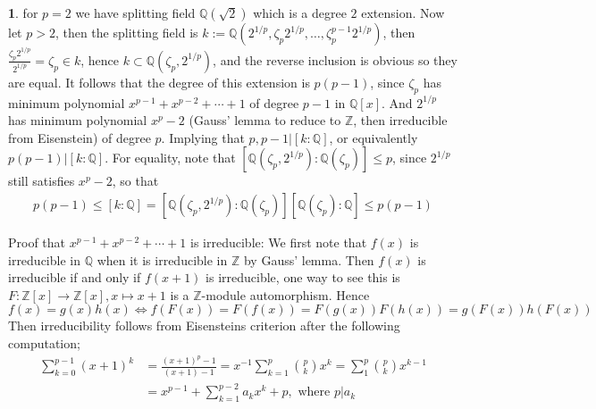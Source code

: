 \documentclass[11pt]{article}
\theoremstyle{definition}
\newtheorem{pb}{}
\begin{document}
    \begin{pb}
        for \(p=2\) we have splitting field \(\mathbb{Q}(\sqrt2)\) which is a degree \(2\) extension. Now let \(p > 2\), then the splitting field is
        \(k := \mathbb{Q}(2^{1/p},\zeta_p2^{1/p},\hdots,\zeta_p^{p-1}2^{1/p})\), then \(\frac{\zeta_p2^{1/p}}{2^{1/p}} = \zeta_p \in k\), hence
        \(k \subset \mathbb{Q}(\zeta_p,2^{1/p})\), and the reverse inclusion is obvious so they are equal. It follows that the degree of this extension is
        \(p(p-1)\), since \(\zeta_p\) has minimum polynomial \(x^{p-1} + x^{p-2} + \cdots + 1\) of degree \(p-1\) in \(\mathbb{Q}[x]\). And \(2^{1/p}\) has minimum polynomial
        \(x^p - 2\) (Gauss' lemma to reduce to \(\mathbb{Z}\), then irreducible from Eisenstein) of degree \(p\). 
        Implying that \(p, p-1 \vert [k:\mathbb{Q}]\), or equivalently \(p(p-1) \vert [k:\mathbb{Q}]\). For equality, note that
        \([\mathbb{Q}(\zeta_p,2^{1/p}):\mathbb{Q}(\zeta_p)] \leq p\), since \(2^{1/p}\) still satisfies \(x^p-2\), so that
        \begin{align*}
            p(p-1) \leq [k:\mathbb{Q}] = [\mathbb{Q}(\zeta_p,2^{1/p}):\mathbb{Q}(\zeta_p)][\mathbb{Q}(\zeta_p):\mathbb{Q}] \leq p(p-1)
        \end{align*}

        Proof that \(x^{p-1} + x^{p-2} + \cdots + 1\) is irreducible: We first note that \(f(x)\) is irreducible in \(\mathbb{Q}\) when it is irreducible in \(\mathbb{Z}\)
        by Gauss' lemma. Then \(f(x)\) is irreducible if and only if \(f(x+1)\) is irreducible, 
        one way to see this is \(F: \mathbb{Z}[x] \to \mathbb{Z}[x], x \mapsto x+1\) is a \(\mathbb{Z}\)-module automorphism.
        Hence \[f(x) = g(x)h(x) \iff f(F(x)) = F(f(x)) = F(g(x))F(h(x)) = g(F(x))h(F(x))\]
        Then irreducibility follows from Eisensteins criterion after the following computation;
        \begin{align*}
            \sum_{k=0}^{p-1} (x+1)^k &= \frac{(x+1)^p - 1}{(x+1)-1} = x^{-1}\sum_{k=1}^p \binom{p}{k}x^k = \sum_1^p  \binom{p}{k}x^{k-1} \\
            &= x^{p-1} + \sum_{k=1}^{p-2}a_kx^k + p, \text{ where } p \vert a_k
        \end{align*}
    \end{pb}
\end{document}
